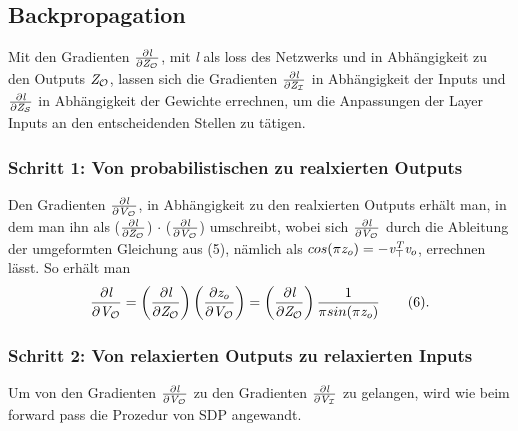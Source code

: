 \subsection{Backpropagation}
\label{backward}
Mit den Gradienten $\frac{\partial \emph{l}}{\partial \emph{Z}_{\mathcal{O}}}$, mit \emph{l} als loss des Netzwerks und in Abhängigkeit zu den Outputs $\emph{Z}_{\mathcal{O}}$, lassen sich die Gradienten $\frac{\partial \emph{l}}{\partial \emph{Z}_{\mathcal{I}}}$ in Abhängigkeit der Inputs und $\frac{\partial \emph{l}}{\partial \emph{Z}_{\mathcal{S}}}$ in Abhängigkeit der Gewichte errechnen, um die Anpassungen der Layer Inputs an den entscheidenden Stellen zu tätigen.
\cite[p.~4-5]{https://doi.org/10.48550/arxiv.1905.12149}
\subsubsection{Schritt 1: Von probabilistischen zu realxierten Outputs}
Den Gradienten $\frac{\partial \emph{l}}{\partial \emph{V}_{\mathcal{O}}}$, in Abhängigkeit zu den realxierten Outputs erhält man, in dem man ihn als ($\frac{\partial \emph{l}}{\partial \emph{Z}_{\mathcal{O}}}$) $\cdot$ ($\frac{\partial \emph{l}}{\partial \emph{V}_{\mathcal{O}}}$) umschreibt, wobei sich $\frac{\partial \emph{l}}{\partial \emph{V}_{\mathcal{O}}}$ durch die Ableitung der umgeformten Gleichung aus (5), nämlich als $cos(\pi\emph{z}_{\emph{o}}) = -\emph{v}_{\top}^\emph{T} \emph{v}_{o}$, errechnen lässt.
So erhält man
\[ \frac{\partial \emph{l}}{\partial \emph{V}_{\mathcal{O}}} = \left (\frac{\partial \emph{l}}{\partial \emph{Z}_{\mathcal{O}}}\right) \left(\frac{\partial \emph{z}_{\emph{o}}}{\partial \emph{V}_{\mathcal{O}}}\right) = \left(\frac{\partial \emph{l}}{\partial \emph{Z}_{\mathcal{O}}}\right) \frac{1}{\pi sin(\pi\emph{z}_{\emph{o}})}\qquad (6).\]
\cite[p.~5]{https://doi.org/10.48550/arxiv.1905.12149}
\subsubsection{Schritt 2: Von relaxierten Outputs zu relaxierten Inputs}
Um von den Gradienten $\frac{\partial \emph{l}}{\partial \emph{V}_{\mathcal{O}}}$ zu den Gradienten $\frac{\partial \emph{l}}{\partial \emph{V}_{\mathcal{I}}}$ zu gelangen, wird wie beim forward pass die Prozedur von SDP angewandt.
\cite[p.~5]{https://doi.org/10.48550/arxiv.1905.12149}
